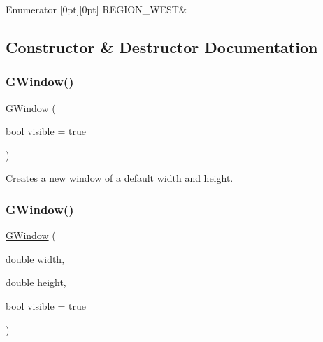 \begin{DoxyEnumFields}{Enumerator}
[0pt][0pt]{}\mbox{\label{classGWindow_a81a01a86de31071a92e6cce0bab9bc4ba5dd8c2219af001263c00de02b642786d}} 
R\+E\+G\+I\+O\+N\+\_\+\+W\+E\+ST&\\
\hline

\end{DoxyEnumFields}


\subsection{Constructor \& Destructor Documentation}
\mbox{\label{classGWindow_a7fdeab875fb526a49423085ac13ac9f2}} 
\subsubsection{\texorpdfstring{G\+Window()}{GWindow()}\hspace{0.1cm}{\footnotesize\ttfamily [1/3]}}
{\footnotesize\ttfamily \mbox{\hyperlink{classGWindow}{G\+Window}} (\begin{DoxyParamCaption}\item[{bool}]{visible = {\ttfamily true} }\end{DoxyParamCaption})}



Creates a new window of a default width and height. 

\mbox{\label{classGWindow_acb88532777f61b140aa8245ed1d9887e}} 
\subsubsection{\texorpdfstring{G\+Window()}{GWindow()}\hspace{0.1cm}{\footnotesize\ttfamily [2/3]}}
{\footnotesize\ttfamily \mbox{\hyperlink{classGWindow}{G\+Window}} (\begin{DoxyParamCaption}\item[{double}]{width,  }\item[{double}]{height,  }\item[{bool}]{visible = {\ttfamily true} }\end{DoxyParamCaption})}



